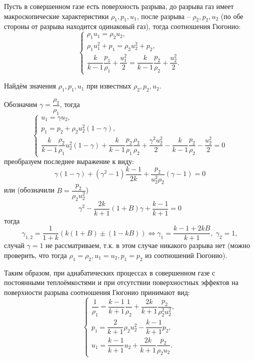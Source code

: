 
Пусть в совершенном газе есть поверхность разрыва, до разрыва газ
имеет макроскопические характеристики $\rho_1, p_1, u_1$, после разрыва -- $\rho_2, p_2, u_2$
(по обе стороны от разрыва находится одинаковый газ),
тогда соотношения Гюгонио:
\[
  \begin{cases}
    \rho_1 u_1 = \rho_2 u_2, \\
    \rho_1 u_1^2 + p_1 = \rho_2 u_2^2 + p_2, \\
    \dfrac{k}{k-1} \dfrac{p_1}{\rho_1} + \dfrac{u_1^2}{2} = \dfrac{k}{k-1} \dfrac{p_2}{\rho_2} + \dfrac{u_2^2}{2}.
  \end{cases}
\]

Найдём значения $\rho_1, p_1, u_1$ при известных $\rho_2, p_2, u_2$.

Обозначим $\gamma = \dfrac{\rho_2}{\rho_1}$, тогда
\[
  \begin{cases}
    u_1 = \gamma u_2, \\
    p_1 = p_2 + \rho_2 u_2^2 (1 - \gamma), \\
    \dfrac{k}{k-1} \dfrac{\rho_2}{\rho_1} u_2^2 (1 - \gamma) + \dfrac{k}{k-1} \dfrac{p_2}{\rho_1} \dfrac{\rho_2}{\rho_2} + \dfrac{\gamma^2 u_2^2}{2} - \dfrac{k}{k-1} \dfrac{p_2}{\rho_2} - \dfrac{u_2^2}{2} = 0
  \end{cases}
\]
преобразуем последнее выражение к виду:
\[
 \gamma(1-\gamma) + (\gamma^2 - 1) \dfrac{k-1}{2k}+ \dfrac{p_2}{u_2^2 \rho_2} (\gamma-1) = 0
\]
или (обозначили $B = \dfrac{p_2}{\rho_2 u_2^2}$)
\[
  \gamma^2 - \dfrac{2k}{k+1} (1 + B) \gamma + \dfrac{k-1}{k+1} = 0
\]
тогда
\[
  \gamma_{1, 2} = \dfrac{1}{1+k} \left( k(1+B) \pm (1 - kB) \right)
  \Leftrightarrow
  \gamma_1 = \dfrac{k-1 +2kB}{k+1}, \; \gamma_2 = 1,
\]
случай $\gamma = 1$ не рассматриваем, т.к. в этом случае никакого разрыва нет (можно проверить,
что тогда $\rho_1=\rho_2, u_1=u_2, p_1=p_2$ из соотношений Гюгонио).

Таким образом, при адиабатических процессах в совершенном газе с постоянными теплоёмкостями
и при отсутствии поверхностных эффектов на поверхности разрыва соотношения Гюгонио принимают вид:
\[
  \begin{cases}
    \dfrac{1}{\rho_1} = \dfrac{k-1}{k+1}\dfrac{1}{\rho_2} + \dfrac{2k}{k+1} \dfrac{p_2}{\rho_2^2 u_2^2}, \\
    p_1 = \dfrac{2}{k+1} \rho_2 u_2^2 - \dfrac{k-1}{k+1} p_2, \\
    u_1 = \dfrac{k-1}{k+1} u_2 + \dfrac{2k}{k+1} \dfrac{p_2}{\rho_2 u_2}.
  \end{cases}  
\]
